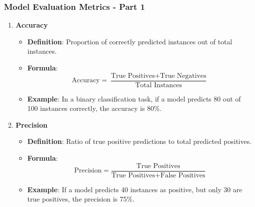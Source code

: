 \documentclass[aspectratio=169]{beamer}
\begin{document}
\begin{frame}[fragile]
    \frametitle{Model Evaluation Metrics - Part 1}
    \begin{enumerate}
        \item \textbf{Accuracy}
            \begin{itemize}
                \item \textbf{Definition}: Proportion of correctly predicted instances out of total instances.
                \item \textbf{Formula}:
                \begin{equation}
                    \text{Accuracy} = \frac{\text{True Positives} + \text{True Negatives}}{\text{Total Instances}}
                \end{equation}
                \item \textbf{Example}: In a binary classification task, if a model predicts 80 out of 100 instances correctly, the accuracy is 80\%.
            \end{itemize}
        
        \item \textbf{Precision}
            \begin{itemize}
                \item \textbf{Definition}: Ratio of true positive predictions to total predicted positives.
                \item \textbf{Formula}:
                \begin{equation}
                    \text{Precision} = \frac{\text{True Positives}}{\text{True Positives} + \text{False Positives}}
                \end{equation}
                \item \textbf{Example}: If a model predicts 40 instances as positive, but only 30 are true positives, the precision is 75\%.
            \end{itemize}
    \end{enumerate}
\end{frame}
\end{document}
